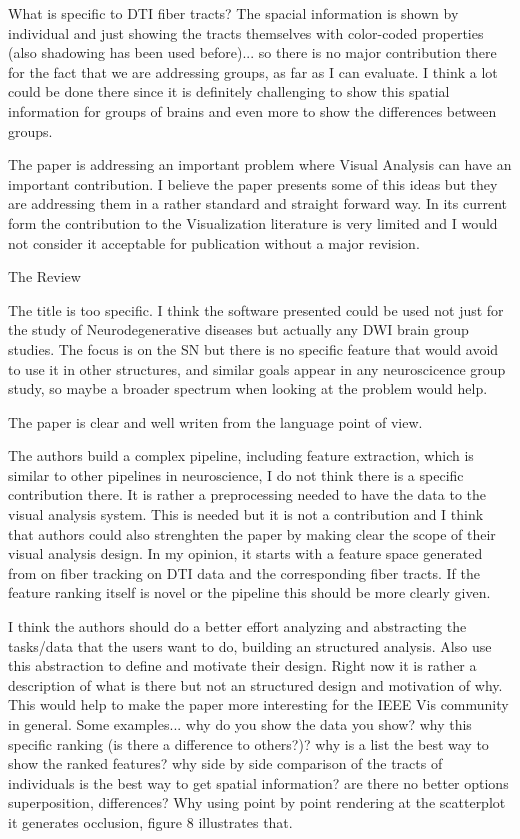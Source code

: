     What is specific to DTI fiber tracts? 
    The spacial information is shown by individual and just showing the tracts
    themselves  with color-coded properties (also shadowing has been used before)...
    so there is no major contribution there for the fact that we are addressing
    groups, as far as I can evaluate. I think a lot could be done there since it is
    definitely challenging to show this spatial information for groups of brains and
    even more to show the differences between groups.

    The paper is addressing an important problem where Visual Analysis can have an
    important contribution. I believe the paper presents some of this ideas but they
    are addressing them in a rather standard and straight forward way.
    In its current form the contribution to the Visualization literature is very
    limited and I would not consider it acceptable for publication without a major
    revision.

  The Review

    The title is too specific. I think the software presented could be used not just
    for the study of Neurodegenerative diseases but actually any DWI brain group
    studies.
    The focus is on the SN but there is no specific feature that would avoid to use it
    in other structures, and similar goals appear in any neuroscicence group study, so
    maybe a broader spectrum when looking at the problem would help.

    The paper is clear and well writen from the language point of view.

    The authors build a complex pipeline, including feature extraction,  which is
    similar to other pipelines in neuroscience, I do not think there is a specific
    contribution there. It is rather a preprocessing needed to have the data to the
    visual analysis system. This is needed but it is not a contribution and I think
    that authors could also strenghten the paper by making clear the scope of their
    visual analysis design. In my opinion, it starts with a feature space generated
    from on fiber tracking on DTI data and the corresponding fiber tracts.
    If the feature ranking itself is novel or the pipeline this should be more clearly
    given.

    I think the authors should do a better effort analyzing and abstracting the
    tasks/data that the users want to do, building an structured analysis. Also use
    this abstraction to define and motivate their design. Right now it is rather a
    description of what is there but not an structured design and motivation of why.
    This would help to make the paper more interesting for the IEEE Vis community in
    general.
    Some examples... why do you show the data you show? why this specific ranking (is
    there a difference to others?)? why is a list the best way to show the ranked
    features? why side by side comparison of the tracts of individuals is the best way
    to get spatial information? are there no better options superposition,
    differences?  Why using point by point rendering at the scatterplot it generates
    occlusion, figure 8 illustrates that.


